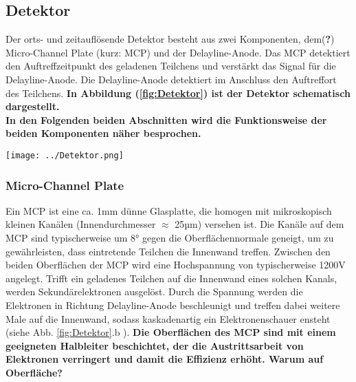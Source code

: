 \subsection{Detektor} \label{sec:Detektor} 

Der orts- und zeitauflösende Detektor besteht aus zwei Komponenten, dem(\textbf{?}) Micro-Channel Plate (kurz: MCP) und der Delayline-Anode. Das MCP detektiert den Auftreffzeitpunkt des geladenen Teilchens und verstärkt das Signal für die Delayline-Anode. Die Delayline-Anode detektiert im Anschluss den Auftreffort des Teilchens. \textbf{In Abbildung (\ref{fig:Detektor}) ist der Detektor schematisch dargestellt.}\\
\textbf{In den Folgenden beiden Abschnitten wird die Funktionsweise der beiden Komponenten näher besprochen.}

\begin{center}
\begin{minipage}{\linewidth}
\centering
\texttt{[image: ../Detektor.png]}%
 \label{fig:Detektor}
\end{minipage} 
\end{center} 

\subsubsection{Micro-Channel Plate}
 Ein MCP ist eine ca. 1mm dünne Glasplatte, die homogen mit mikroskopisch kleinen Kanälen (Innendurchmesser $\approx$ 25µm) versehen ist. Die Kanäle auf dem MCP sind typischerweise um 8° gegen die Oberflächennormale geneigt, um zu gewährleisten, dass eintretende Teilchen die Innenwand treffen. Zwischen den beiden Oberflächen der MCP wird eine Hochspannung von typischerweise 1200V angelegt.
 Trifft ein geladenes Teilchen auf die Innenwand eines solchen Kanals, werden Sekundärelektronen ausgelöst. Durch die Spannung werden die Elektronen in Richtung Delayline-Anode beschleunigt und treffen dabei weitere Male auf die Innenwand, sodass kaskadenartig ein Elektronenschauer ensteht (siehe Abb. \ref{fig:Detektor}.b ). \textbf{Die Oberflächen des MCP sind mit einem geeigneten Halbleiter beschichtet, der die Austrittsarbeit von Elektronen verringert und damit die Effizienz erhöht. Warum auf Oberfläche?}
 
